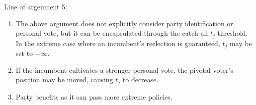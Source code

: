 \documentclass[hyphens, crop=false]{standalone}
\begin{document}
\newpage
	Line of argeument 5:
	\begin{enumerate}
		\item 
		The above argument does not explicitly consider party identification or personal vote, but it can be encapsulated through the catch-all $t_j$ threshold.
		In the extreme case where an incumbent's reelection is guaranteed, $t_j$ may be set to $-\infty$.
		\item 
		If the incumbent cultivates a stronger personal vote, the pivotal voter's position may be moved, causing $t_j$ to decrease.
		\item 
		Party benefits as it can pass more extreme policies.
	\end{enumerate}



%	
%	
%	
\end{document}
